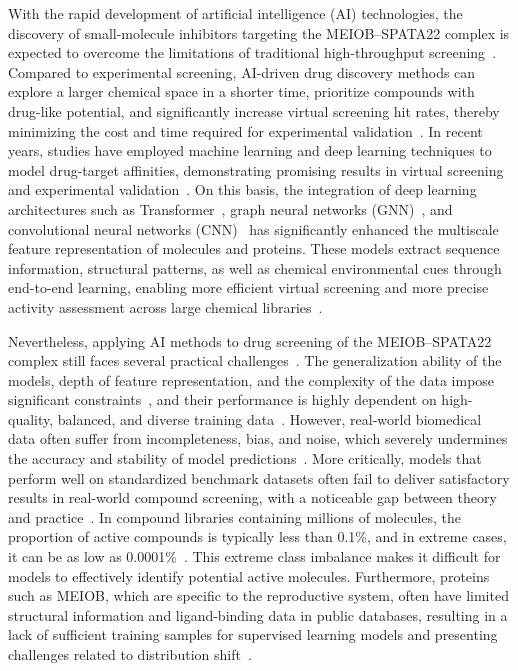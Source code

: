 \documentclass[unnumsec,webpdf,contemporary,large]{oup-authoring-template}%
\theoremstyle{thmstyleone}%
\theoremstyle{thmstyletwo}%
\theoremstyle{thmstylethree}%
\begin{document}
With the rapid development of artificial intelligence (AI) technologies, the discovery of small-molecule inhibitors targeting the MEIOB–SPATA22 complex is expected to overcome the limitations of traditional high-throughput screening~\cite{21}. Compared to experimental screening, AI-driven drug discovery methods can explore a larger chemical space in a shorter time, prioritize compounds with drug-like potential, and significantly increase virtual screening hit rates, thereby minimizing the cost and time required for experimental validation~\cite{22}. In recent years, studies have employed machine learning and deep learning techniques to model drug-target affinities, demonstrating promising results in virtual screening and experimental validation~\cite{23,24,25,26,27}. On this basis, the integration of deep learning architectures such as Transformer~\cite{28}, graph neural networks (GNN)~\cite{29}, and convolutional neural networks (CNN)~\cite{30} has significantly enhanced the multiscale feature representation of molecules and proteins. These models extract sequence information, structural patterns, as well as chemical environmental cues through end-to-end learning, enabling more efficient virtual screening and more precise activity assessment across large chemical libraries~\cite{31,32,33,34}.

Nevertheless, applying AI methods to drug screening of the MEIOB–SPATA22 complex still faces several practical challenges~\cite{35,36}. The generalization ability of the models, depth of feature representation, and the complexity of the data impose significant constraints~\cite{37}, and their performance is highly dependent on high-quality, balanced, and diverse training data~\cite{38,39}. However, real-world biomedical data often suffer from incompleteness, bias, and noise, which severely undermines the accuracy and stability of model predictions~\cite{40}. More critically, models that perform well on standardized benchmark datasets often fail to deliver satisfactory results in real-world compound screening, with a noticeable gap between theory and practice~\cite{41}. In compound libraries containing millions of molecules, the proportion of active compounds is typically less than 0.1\%, and in extreme cases, it can be as low as 0.0001\%~\cite{42,43}. This extreme class imbalance makes it difficult for models to effectively identify potential active molecules. Furthermore, proteins such as MEIOB, which are specific to the reproductive system, often have limited structural information and ligand-binding data in public databases, resulting in a lack of sufficient training samples for supervised learning models and presenting challenges related to distribution shift~\cite{44}.
\end{document}
